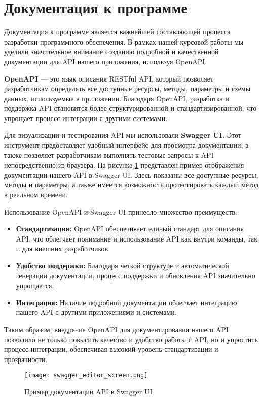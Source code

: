 \section{Документация к программе}

Документация к программе является важнейшей составляющей процесса разработки программного обеспечения. В рамках нашей курсовой работы мы уделили значительное внимание созданию подробной и качественной документации для API нашего приложения, используя OpenAPI.

\textbf{OpenAPI} — это язык описания RESTful API, который позволяет разработчикам определять все доступные ресурсы, методы, параметры и схемы данных, используемые в приложении. Благодаря OpenAPI, разработка и поддержка API становится более структурированной и стандартизированной, что упрощает процесс интеграции с другими системами.

Для визуализации и тестирования API мы использовали \textbf{Swagger UI}. Этот инструмент предоставляет удобный интерфейс для просмотра документации, а также позволяет разработчикам выполнять тестовые запросы к API непосредственно из браузера. На рисунке \ref{swagger} представлен пример отображения документации нашего API в Swagger UI. Здесь показаны все доступные ресурсы, методы и параметры, а также имеется возможность протестировать каждый метод в реальном времени.

Использование OpenAPI и Swagger UI принесло множество преимуществ:
\begin{itemize}
    \item \textbf{Стандартизация:} OpenAPI обеспечивает единый стандарт для описания API, что облегчает понимание и использование API как внутри команды, так и для внешних разработчиков.
    \item \textbf{Удобство поддержки:} Благодаря четкой структуре и автоматической генерации документации, процесс поддержки и обновления API значительно упрощается.
    \item \textbf{Интеграция:} Наличие подробной документации облегчает интеграцию нашего API с другими приложениями и системами.
\end{itemize}

Таким образом, внедрение OpenAPI для документирования нашего API позволило не только повысить качество и удобство работы с API, но и упростить процесс интеграции, обеспечивая высокий уровень стандартизации и прозрачности.

\begin{figure}[h]
    \centering
    \texttt{[image: swagger\_editor\_screen.png]}
    \caption{Пример документации API в Swagger UI}
    \label{swagger}
\end{figure}
